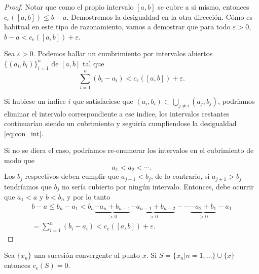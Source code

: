 \begin{proof} Notar que como el propio intervalo $[a,b]$ se cubre a si mismo, entonces $c_e([a,b])\leq b-a$. Demostremos la desigualdad en la otra dirección. Cómo es habitual en este tipo de razonamiento, vamos a demostrar que para todo $\varepsilon>0$,  $b-a<c_e([a,b])+\varepsilon$. 

Sea $\varepsilon>0$. Podemos hallar un cumbrimiento por intervalos abiertos $\{(a_i,b_i)\}_{i=1}^n$ de $[a,b]$ tal que
\begin{equation}\label{eq:con_int} \sum_{i=1}^n(b_i-a_i)<c_e([a,b])+\varepsilon.\end{equation}

Si hubiese un índice $i$ que satisfaciese que $(a_i,b_i)\subset\bigcup_{j\neq i}(a_j,b_j)$, podríamos eliminar el intervalo correspondiente a ese indice, los intervalos restantes continuarían siendo un cubrimiento y seguiría cumpliendose la desigualdad \eqref{eq:con_int}. 

Si no se diera el caso, podríamos re-enumerar los intervalos en el cubrimiento de modo que 
$$a_1<a_2<\cdots .$$
Los $b_j$ respectivos deben cumplir que $a_{j+1}<b_{j}$, de lo contrario, si $a_{j+1}> b_j$ tendríamos que $b_j$ no sería cubierto por ningún intervalo. Entonces, debe ocurrir que $a_1<a$ y $b<b_n$ y por lo tanto
\begin{multline*}
 b-a\leq b_n-a_1<b_n\underbrace{-a_{n}+b_{n-1}}_{>0}\underbrace{-a_{n-1}+b_{n-2}}_{>0}-\cdots \underbrace{-a_2+b_1}_{>0}-a_1\\
=\sum_{i=1}^n(b_i-a_i)<c_e([a,b])+\varepsilon.
\end{multline*}
\end{proof}


 \begin{ejercicio}{} Sea $\{x_n\}$ una sucesión convergente al punto $x$. Si $S=\{x_n| n=1,\dots\}\cup\{x\}$ entonces  $c_e(S)=0$.  
  \end{ejercicio}
 
